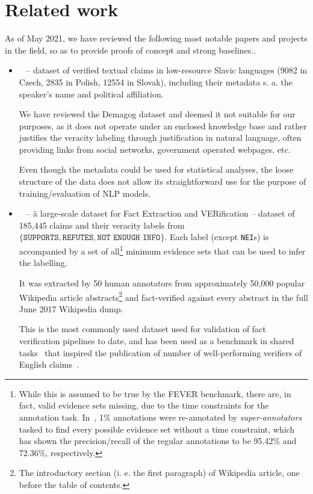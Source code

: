 \section{Related work}
As of May 2021, we have reviewed the following most notable papers and projects in the field, so as to provide proofs of concept and strong baselines..
\begin{itemize}
    \item {}~\cite{hercig-lenc:2019:RANLP} -- dataset of verified textual claims in low-resource Slavic languages (9082 in Czech, 2835 in Polish, 12554 in Slovak), including their metadata s. a. the speaker's name and political affiliation.
    
    We have reviewed the Demagog dataset and deemed it not suitable for our purposes, as it does not operate under an enclosed knowledge base and rather justifies the veracity labeling through justification in natural language, often providing links from social networks, government operated webpages, etc.
    
    Even though the metadata could be used for statistical analyses, the loose structure of the data does not allow its straightforward use for the purpose of training/evaluation of NLP models.
    \item {}~\cite{fever} -- \"{a large-scale dataset for Fact Extraction and VERification} -- dataset of 185,445 claims and their veracity labels from $\{\texttt{SUPPORTS},\texttt{REFUTES},\texttt{NOT ENOUGH INFO}\}$. Each label (except \texttt{NEI}s) is accompanied by a set of all\footnote{While this is assumed to be true by the \textsf{FEVER} benchmark, there are, in fact, valid evidence sets missing, due to the time constraints for the annotation task. In~\cite{fever}, 1\% annotations were re-annotated by \textit{super-annotators} tasked to find every possible evidence set without a time constraint, which has shown the precision/recall of the regular annotations to be 95.42\% and 72.36\%, respectively.} minimum evidence sets that can be used to infer the labelling. 
    
    It was extracted by 50 human annotators from approximately 50,000 popular \textsf{Wikipedia} article abstracts\footnote{The introductory section (i. e. the first paragraph) of \textsf{Wikipedia} article, one before the table of contents.} and fact-verified against every abstract in the full June 2017 \textsf{Wikipedia} dump.
    
    This is the most commonly used dataset used for validation of fact verification pipelines to date, and has been used as a benchmark in shared tasks~\cite{fever1,fever2adversarial} that inspired the publication of number of well-performing verifiers of English claims~\cite{papelo,athene,nie2019combining}.
    

\end{itemize}
